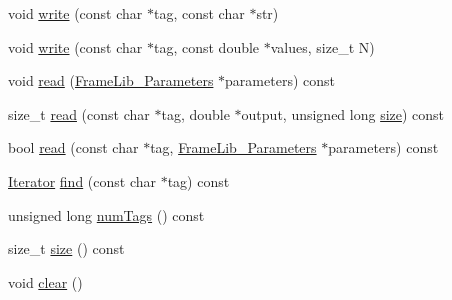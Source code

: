 \begin{DoxyCompactItemize}
\item 
void \hyperlink{class_frame_lib___parameters_1_1_serial_ac28ddf8524a2f0124ed8b6585a59fe10}{write} (const char $\ast$tag, const char $\ast$str)
\item 
void \hyperlink{class_frame_lib___parameters_1_1_serial_a27af79a7ed1e500511e36731ec10b910}{write} (const char $\ast$tag, const double $\ast$values, size\+\_\+t N)
\item 
void \hyperlink{class_frame_lib___parameters_1_1_serial_a16178b2e34449dc5f63d5d2f16ba17d5}{read} (\hyperlink{class_frame_lib___parameters}{Frame\+Lib\+\_\+\+Parameters} $\ast$parameters) const
\item 
size\+\_\+t \hyperlink{class_frame_lib___parameters_1_1_serial_a5a64915b68ad73b54c3e9962f88881ed}{read} (const char $\ast$tag, double $\ast$output, unsigned long \hyperlink{class_frame_lib___parameters_1_1_serial_a04ad46904d9fd8119283eae663901886}{size}) const
\item 
bool \hyperlink{class_frame_lib___parameters_1_1_serial_a8ba7895df50f7dbb958c1491a3056a89}{read} (const char $\ast$tag, \hyperlink{class_frame_lib___parameters}{Frame\+Lib\+\_\+\+Parameters} $\ast$parameters) const
\item 
\hyperlink{class_frame_lib___parameters_1_1_serial_1_1_iterator}{Iterator} \hyperlink{class_frame_lib___parameters_1_1_serial_ae6a3ad293e63a0a78cefa4f6dab67e89}{find} (const char $\ast$tag) const
\item 
unsigned long \hyperlink{class_frame_lib___parameters_1_1_serial_aeb9bb5fe23de9ac0f39f8d8e14a4c670}{num\+Tags} () const
\item 
size\+\_\+t \hyperlink{class_frame_lib___parameters_1_1_serial_a04ad46904d9fd8119283eae663901886}{size} () const
\item 
void \hyperlink{class_frame_lib___parameters_1_1_serial_a5c5fdd1e22ef366407e77b09554df8f8}{clear} ()
\end{DoxyCompactItemize}
